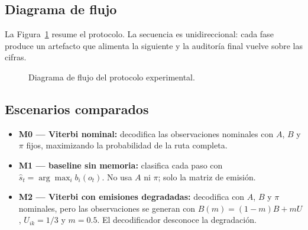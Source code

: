 \documentclass[11pt,letterpaper]{article}
\begin{document}
\subsection{Diagrama de flujo}

La Figura~\ref{fig:flujo} resume el protocolo. La secuencia es unidireccional: cada fase produce un artefacto que alimenta la siguiente y la auditoría final vuelve sobre las cifras.

\begin{figure}[H]
\centering
{}
\caption{Diagrama de flujo del protocolo experimental.}
\label{fig:flujo}
\end{figure}

\subsection{Escenarios comparados}

\begin{itemize}
  \item \textbf{M0 --- Viterbi nominal:} decodifica las observaciones nominales con \(A\), \(B\) y \(\pi\) fijos, maximizando la probabilidad de la ruta completa.
  \item \textbf{M1 --- baseline sin memoria:} clasifica cada paso con \(\hat{s}_t=\arg\max_i b_i(o_t)\). No usa \(A\) ni \(\pi\); solo la matriz de emisión.
  \item \textbf{M2 --- Viterbi con emisiones degradadas:} decodifica con \(A\), \(B\) y \(\pi\) nominales, pero las observaciones se generan con \(B(m)= (1-m)B+mU\), \(U_{ik}=1/3\) y \(m=0.5\). El decodificador desconoce la degradación.
\end{itemize}
\end{document}
